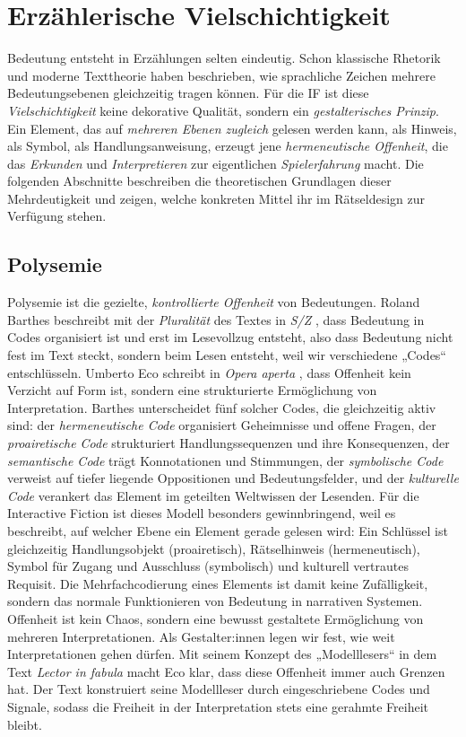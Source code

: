 \documentclass[parskip=half,a4paper,11pt]{scrreprt}
\begin{document}
\section{Erzählerische Vielschichtigkeit}

Bedeutung entsteht in Erzählungen selten eindeutig. Schon klassische Rhetorik und moderne Texttheorie haben beschrieben, wie sprachliche Zeichen mehrere Bedeutungsebenen gleichzeitig tragen können. Für die IF ist diese \textit{Vielschichtigkeit} keine dekorative Qualität, sondern ein \textit{gestalterisches Prinzip}. Ein Element, das auf \textit{mehreren Ebenen zugleich} gelesen werden kann, als Hinweis, als Symbol, als Handlungsanweisung, erzeugt jene \textit{hermeneutische Offenheit}, die das \textit{Erkunden} und\textit{ Interpretieren} zur eigentlichen \textit{Spielerfahrung} macht. Die folgenden Abschnitte beschreiben die theoretischen Grundlagen dieser Mehrdeutigkeit und zeigen, welche konkreten Mittel ihr im Rätseldesign zur Verfügung stehen.

\subsection{Polysemie}

Polysemie ist die gezielte, \textit{kontrollierte Offenheit} von Bedeutungen. Roland Barthes beschreibt mit der \textit{Pluralität} des Textes in \textit{S/Z} \citep{Barthes1970}, dass Bedeutung in Codes organisiert ist und erst im Lesevollzug entsteht, also dass Bedeutung nicht fest im Text steckt, sondern beim Lesen entsteht, weil wir verschiedene „Codes“ entschlüsseln. Umberto Eco schreibt in \textit{Opera aperta} \citep{Eco1962}, dass Offenheit kein Verzicht auf Form ist, sondern eine strukturierte Ermöglichung von Interpretation. Barthes unterscheidet fünf solcher Codes, die gleichzeitig aktiv sind: der \textit{hermeneutische Code} organisiert Geheimnisse und offene Fragen, der \textit{proairetische Code} strukturiert Handlungssequenzen und ihre Konsequenzen, der \textit{semantische Code} trägt Konnotationen und Stimmungen, der \textit{symbolische Code} verweist auf tiefer liegende Oppositionen und Bedeutungsfelder, und der \textit{kulturelle Code} verankert das Element im geteilten Weltwissen der Lesenden. Für die Interactive Fiction ist dieses Modell besonders gewinnbringend, weil es beschreibt, auf welcher Ebene ein Element gerade gelesen wird: Ein Schlüssel ist gleichzeitig Handlungsobjekt (proairetisch), Rätselhinweis (hermeneutisch), Symbol für Zugang und Ausschluss (symbolisch) und kulturell vertrautes Requisit. Die Mehrfachcodierung eines Elements ist damit keine Zufälligkeit, sondern das normale Funktionieren von Bedeutung in narrativen Systemen. Offenheit ist kein Chaos, sondern eine bewusst gestaltete Ermöglichung von mehreren Interpretationen. Als Gestalter:innen legen wir fest, wie weit Interpretationen gehen dürfen. Mit seinem Konzept des „Modelllesers“ in dem Text \textit{Lector in fabula} \citep{Eco1987} macht Eco klar, dass diese Offenheit immer auch Grenzen hat. Der Text konstruiert seine Modellleser durch eingeschriebene Codes und Signale, sodass die Freiheit in der Interpretation stets eine gerahmte Freiheit bleibt.
\end{document}
